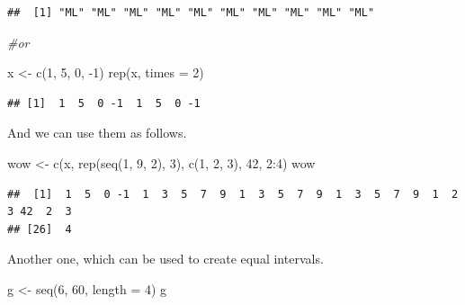 \documentclass[
]{book}
\newenvironment{Shaded}{\begin{snugshade}}{\end{snugshade}}
\newcommand{\AttributeTok}[1]{\textcolor[rgb]{0.77,0.63,0.00}{#1}}
\newcommand{\CommentTok}[1]{\textcolor[rgb]{0.56,0.35,0.01}{\textit{#1}}}
\newcommand{\DecValTok}[1]{\textcolor[rgb]{0.00,0.00,0.81}{#1}}
\newcommand{\FunctionTok}[1]{\textcolor[rgb]{0.00,0.00,0.00}{#1}}
\newcommand{\NormalTok}[1]{#1}
\newcommand{\OtherTok}[1]{\textcolor[rgb]{0.56,0.35,0.01}{#1}}
\newcommand{\SpecialCharTok}[1]{\textcolor[rgb]{0.00,0.00,0.00}{#1}}
\begin{document}
\begin{verbatim}
##  [1] "ML" "ML" "ML" "ML" "ML" "ML" "ML" "ML" "ML" "ML"
\end{verbatim}

\begin{Shaded}
\begin{Highlighting}[]
\CommentTok{\#or}

\NormalTok{x }\OtherTok{\textless{}{-}} \FunctionTok{c}\NormalTok{(}\DecValTok{1}\NormalTok{, }\DecValTok{5}\NormalTok{, }\DecValTok{0}\NormalTok{, }\SpecialCharTok{{-}}\DecValTok{1}\NormalTok{)}
\FunctionTok{rep}\NormalTok{(x, }\AttributeTok{times =} \DecValTok{2}\NormalTok{)}
\end{Highlighting}
\end{Shaded}

\begin{verbatim}
## [1]  1  5  0 -1  1  5  0 -1
\end{verbatim}

And we can use them as follows.

\begin{Shaded}
\begin{Highlighting}[]
\NormalTok{wow }\OtherTok{\textless{}{-}} \FunctionTok{c}\NormalTok{(x, }\FunctionTok{rep}\NormalTok{(}\FunctionTok{seq}\NormalTok{(}\DecValTok{1}\NormalTok{, }\DecValTok{9}\NormalTok{, }\DecValTok{2}\NormalTok{), }\DecValTok{3}\NormalTok{), }\FunctionTok{c}\NormalTok{(}\DecValTok{1}\NormalTok{, }\DecValTok{2}\NormalTok{, }\DecValTok{3}\NormalTok{), }\DecValTok{42}\NormalTok{, }\DecValTok{2}\SpecialCharTok{:}\DecValTok{4}\NormalTok{)}
\NormalTok{wow}
\end{Highlighting}
\end{Shaded}

\begin{verbatim}
##  [1]  1  5  0 -1  1  3  5  7  9  1  3  5  7  9  1  3  5  7  9  1  2  3 42  2  3
## [26]  4
\end{verbatim}

Another one, which can be used to create equal intervals.

\begin{Shaded}
\begin{Highlighting}[]
\NormalTok{g }\OtherTok{\textless{}{-}} \FunctionTok{seq}\NormalTok{(}\DecValTok{6}\NormalTok{, }\DecValTok{60}\NormalTok{, }\AttributeTok{length =} \DecValTok{4}\NormalTok{)}
\NormalTok{g}
\end{Highlighting}
\end{Shaded}
\end{document}
